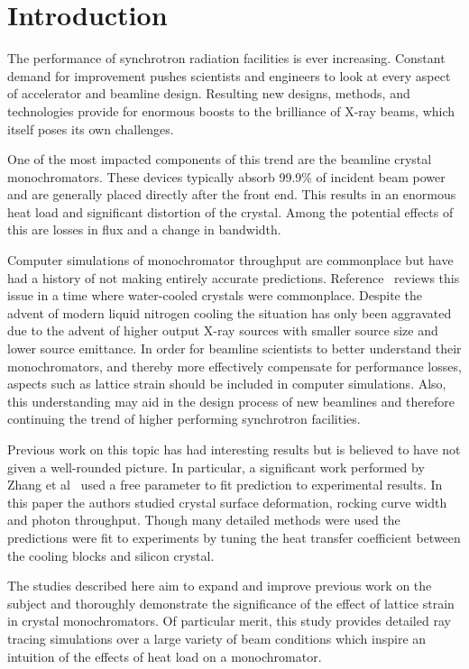 \documentclass[preprint]{iucr}              %
\begin{document}
\section{Introduction}

The performance of synchrotron radiation facilities is ever increasing. Constant demand for improvement pushes scientists and engineers to look at every aspect of accelerator and beamline design. Resulting new designs, methods, and technologies provide for enormous boosts to the brilliance of X-ray beams, which itself poses its own challenges.

One of the most impacted components of this trend are the beamline crystal monochromators. These devices typically absorb 99.9\% of incident beam power~\cite{willmott} and are generally placed directly after the front end. This results in an enormous heat load and significant distortion of the crystal. Among the potential effects of this are losses in flux and a change in bandwidth.

Computer simulations of monochromator throughput are commonplace but have had a history of not making entirely accurate predictions. Reference~\cite{innacuratepredictions} reviews this issue in a time where water-cooled crystals were commonplace. Despite the advent of modern liquid nitrogen cooling the situation has only been aggravated due to the advent of higher output X-ray sources with smaller source size and lower source emittance. In order for beamline scientists to better understand their monochromators, and thereby more effectively compensate for performance losses, aspects such as lattice strain should be included in computer simulations. Also, this understanding may aid in the design process of new beamlines and therefore continuing the trend of higher performing synchrotron facilities.

Previous work on this topic has had interesting results but is believed to have not given a well-rounded picture. In particular, a significant work performed by Zhang et al~\cite{Zhang} used a free parameter to fit prediction to experimental results. In this paper the authors studied crystal surface deformation, rocking curve width and photon throughput. Though many detailed methods were used the predictions were fit to experiments by tuning the heat transfer coefficient between the cooling blocks and silicon crystal.

The studies described here aim to expand and improve previous work on the subject and thoroughly demonstrate the significance of the effect of lattice strain in crystal monochromators. Of particular merit, this study provides detailed ray tracing simulations over a large variety of beam conditions which inspire an intuition of the effects of heat load on a monochromator.
\end{document}
